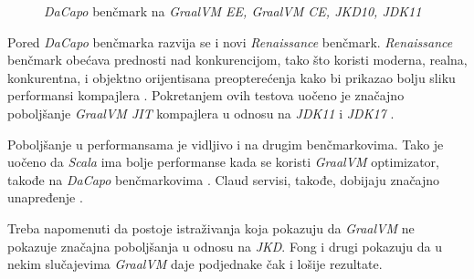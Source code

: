 \documentclass[a4paper]{article}
\begin{document}
\begin{figure}
\begin{center}
\end{center}
    \caption{\emph{DaCapo} benčmark na \emph{GraalVM EE, GraalVM CE, JKD10, JDK11}}
\label{fig:dacapo}
\end{figure}

Pored \emph{DaCapo} benčmarka razvija se i novi \emph{Renaissance} benčmark. \emph{Renaissance} benčmark obećava prednosti nad konkurencijom, tako što koristi moderna, realna, konkurentna, i objektno orijentisana preopterećenja kako bi prikazao bolju sliku performansi kompajlera \cite{prokopec19}. Pokretanjem ovih testova uočeno je značajno poboljšanje \emph{GraalVM JIT} kompajlera u odnosu na \emph{JDK11} i \emph{JDK17} \cite{renaissance}.

Poboljšanje u performansama je vidljivo i na drugim benčmarkovima. Tako je uočeno da \emph{Scala} ima bolje performanse kada se koristi \emph{GraalVM} optimizator, takođe na \emph{DaCapo} benčmarkovima \cite{stadler13, dacapo}. Claud servisi, takođe, dobijaju značajno unapređenje \cite{sipek21}. 

Treba napomenuti da postoje istraživanja koja pokazuju da \emph{GraalVM} ne pokazuje značajna poboljšanja u odnosu na \emph{JKD}. Fong i drugi \cite{fong21} pokazuju da u nekim slučajevima \emph{GraalVM} daje podjednake čak i lošije rezultate. 
\end{document}
